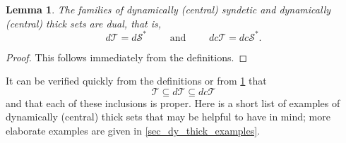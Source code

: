 \documentclass[letter,11pt]{article}
\theoremstyle{plain}
\newtheorem{lemma}[theorem]{Lemma}
\theoremstyle{definition}
\theoremstyle{plain}
\theoremstyle{plain}
\numberwithin{equation}{section}
\newcommand{\thick}{\mathcal{T}}
\newcommand{\dsyndetic}{d\mathcal{S}}
\newcommand{\dthick}{d\mathcal{T}}
\newcommand{\dcsyndetic}{dc\mathcal{S}}
\newcommand{\dcthick}{dc\mathcal{T}}
\begin{document}
\begin{lemma}
    \label{lemma_dt_and_ds_duals}
    The families of dynamically (central) syndetic and dynamically (central) thick sets are dual, that is,
    \[
        \dthick = \dsyndetic^* \qquad \text{ and } \qquad \dcthick = \dcsyndetic^*.
    \]
\end{lemma}

\begin{proof}
    This follows immediately from the definitions. 
\end{proof}

It can be verified quickly from the definitions or from \cref{lemma_dt_and_ds_duals} that
\[\thick \subseteq \dthick \subseteq \dcthick\]
and that each of these inclusions is proper.  Here is a short list of examples of dynamically (central) thick sets that may be helpful to have in mind; more elaborate examples are given in \cref{sec_dy_thick_examples}.
\end{document}
